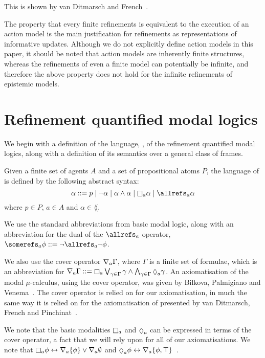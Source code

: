 This is shown by van Ditmarsch and French~\cite{french2009simulation}.

The property that every finite refinements is equivalent to the execution of an
action model is the main justification for refinements as representations of
informative updates. Although we do not explicitly define action models in this
paper, it should be noted that action models are inherently finite structures,
whereas the refinements of even a finite model can potentially be infinite, and
therefore the above property does not hold for the infinite refinements of
epistemic models.

\section{Refinement quantified modal logics}

We begin with a definition of the language, \langF{}, of the refinement
quantified modal logics, along with a definition of its semantics over a general
class of frames.

\begin{definition}
Given a finite set of agents $A$ and a set of propositional atoms $P$, the
language of \langF{} is defined by the following abstract syntax:
$$
\alpha ::=  p \bnfalt
            \neg \alpha \bnfalt
            \alpha \land \alpha \bnfalt
            \knows_a \alpha \bnfalt
            \allrefs_a \alpha
$$
where $p \in P$, $a \in A$ and $\alpha \in \lang{}$.
\end{definition}

We use the standard abbreviations from basic modal logic, along with an
abbreviation for the dual of the $\allrefs_a$ operator, $\somerefs_a \phi ::=
\neg \allrefs_a \neg \phi$.

We also use the cover operator $\nabla_a \Gamma$, where $\Gamma$ is a finite
set of formulae, which is an abbreviation for $\covers_a \Gamma ::= \knows_a
\bigvee_{\gamma \in \Gamma} \gamma \land \bigwedge_{\gamma \in \Gamma}
\suspects_a \gamma$. An axiomatisation of the modal $\mu$-calculus, using the
cover operator, was given by Bilkova, Palmigiano and
Venema~\cite{bilkova2008proof}. The cover operator is relied on for our
axiomatisation, in much the same way it is relied on for the axiomatisation of
\logicKiF{} presented by van Ditmarsch, French and
Pinchinat~\cite{french2010future}.

We note that the basic modalities $\knows_a$ and $\suspects_a$ can be expressed
in terms of the cover operator, a fact that we will rely upon for all of our
axiomatisations. We note that $\knows_a \phi \iff \covers_a \{\phi\} \lor
\covers_a \emptyset$ and $\suspects_a \phi \iff \covers_a \{\phi,
\top\}$~\cite{bilkova2008proof}. 


